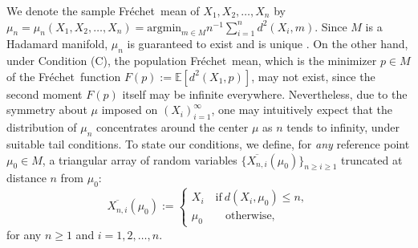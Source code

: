 \documentclass[preprint]{imsart}
\def\Frechet{Fr\'{e}chet}
\theoremstyle{plain}
\newtheorem{theorem}{Theorem}
\theoremstyle{remark}
\begin{document}
We denote the sample \Frechet\ mean of $X_1, X_2, \ldots, X_n$ by 
$\mu_n = \mu_{n}(X_1, X_2, \ldots, X_{n})=\mbox{argmin}_{m\in M}n^{-1}\sum_{i=1}^{n} d^2(X_i,m)$.
Since $M$ is a Hadamard manifold, $\mu_n$ is guaranteed to exist and is unique \citep[][Proposition 4.3]{afsari2011riemannian}. On the other hand, under Condition (C), the population \Frechet\ mean, which is the minimizer $p \in M$ of the \Frechet\ function $F(p):= \mathbb{E}[d^2(X_1,p)]$, may not exist, since the second moment $F(p)$ itself may be infinite everywhere. %
Nevertheless, due to the symmetry about $\mu$ imposed on $(X_i)_{i=1}^{\infty}$, one may intuitively expect that the distribution of $\mu_{n}$ concentrates around the center $\mu$ as $n$ tends to infinity, under suitable tail conditions.  
%
%
To state our conditions,  we define, for \textit{any} reference point $\mu_0 \in M$, a triangular array of random variables $\{\overline{X_{n, i}}(\mu_0)\} _{n\ge i\ge 1}$ truncated at distance $n$ from $\mu_0$: 
$$\overline{X_{n, i}}(\mu_0) := \begin{cases} X_i \quad \mbox{if} ~ d(X_{i}, \mu_0) \le n, \\ \mu_0 \qquad \mbox{otherwise}, \end{cases}$$ 
for any $n\ge 1$ and $i=1, 2, \ldots, n$. 

\end{document}
